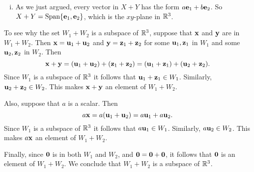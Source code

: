 \begin{example}
\begin{enumerate}[i.]
	\item As we just argued, every vector in $X+Y$ has the form $a\mathbf{e}_1+b\mathbf{e}_2$. So $X+Y = \text{Span}\{\mathbf{e}_1,\mathbf{e}_2\}$, which is the $xy$-plane in $\mathbb{R}^3$. 
	
	\end{enumerate}

\item To see why the set $W_1+W_2$ is a subspace of $\mathbb{R}^3$, suppose that $\mathbf{x}$ and $\mathbf{y}$ are in $W_1+W_2$. Then $\mathbf{x} = \mathbf{u}_1+\mathbf{u}_2$ and $\mathbf{y} = \mathbf{z}_1+\mathbf{z}_2$ for some $\mathbf{u}_1, \mathbf{z}_1$ in $W_1$ and some $\mathbf{u}_2, \mathbf{z}_2$ in $W_2$. Then
\[\mathbf{x}+\mathbf{y} = (\mathbf{u}_1+\mathbf{u}_2)+(\mathbf{z}_1+\mathbf{z}_2) = (\mathbf{u}_1+\mathbf{z}_1)+(\mathbf{u}_2+\mathbf{z}_2).\]
Since $W_1$ is a subspace of $\mathbb{R}^3$ it follows that $\mathbf{u}_1+\mathbf{z}_1 \in W_1$. Similarly, $\mathbf{u}_2+\mathbf{z}_2 \in W_2$. This makes $\mathbf{x} + \mathbf{y}$ an element of $W_1+W_2$. 

Also, suppose that $a$ is a scalar. Then
\[a \mathbf{x} = a(\mathbf{u}_1+\mathbf{u}_2) = a\mathbf{u}_1 + a\mathbf{u}_2.\]
Since $W_1$ is a subspace of $\mathbb{R}^3$ it follows that $a\mathbf{u}_1 \in W_1$. Similarly, $a\mathbf{u}_2 \in W_2$. This makes $a\mathbf{x}$ an element of $W_1+W_2$. 

Finally, since $\mathbf{0}$ is in both $W_1$ and $W_2$, and $\mathbf{0} = \mathbf{0} + \mathbf{0}$, it follows that $\mathbf{0}$ is an element of $W_1+W_2$. We conclude that $W_1+W_2$ is a subspace of $\mathbb{R}^3$. 

\ea

\end{example}


